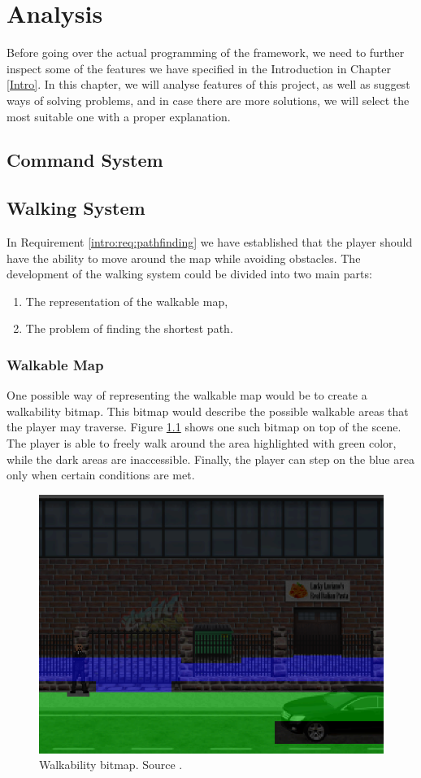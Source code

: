 \chapter{Analysis}

Before going over the actual programming of the framework, we need to further inspect some of the features we have specified in the Introduction in Chapter \ref{Intro}. In this chapter, we will analyse features of this project, as well as suggest ways of solving problems, and in case there are more solutions, we will select the most suitable one with a proper explanation.


\section{Command System}


\section{Walking System}
In Requirement \ref{intro:req:pathfinding}  we have established that the player should have the ability to move around the map while avoiding obstacles. 
The development of the walking system could be divided into two main parts:
\begin{enumerate}
    \item The representation of the walkable map,
    \item The problem of finding the shortest path.
\end{enumerate} 

\subsection{Walkable Map}
One possible way of representing the walkable map would be to create a walkability bitmap. This bitmap would describe the possible walkable areas that the player may traverse. Figure \ref{fig:Bitmap} shows one such bitmap on top of the scene. The player is able to freely walk around the area highlighted with green color, while the dark areas are inaccessible. Finally, the player can step on the blue area only when certain conditions are met. 

\begin{figure}[H]
\centering
\includegraphics[width=.8\linewidth]{img/walkability.png}
\caption{Walkability bitmap. Source \cite{Shdon}.}
\label{fig:Bitmap}
\end{figure}

